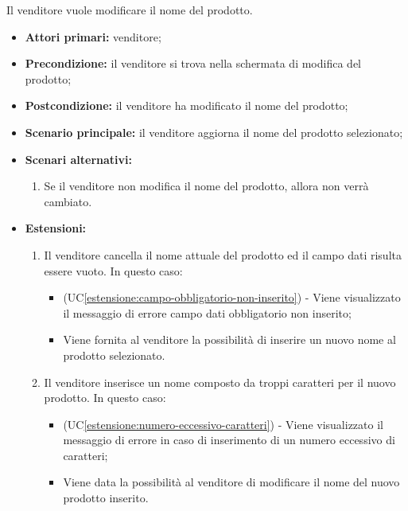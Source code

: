 Il venditore vuole modificare il nome del prodotto.
\begin{itemize}
    \item \textbf{Attori primari:} venditore;
    \item \textbf{Precondizione:} il venditore si trova nella schermata di modifica del prodotto;
    \item \textbf{Postcondizione:} il venditore ha modificato il nome del prodotto;
    \item \textbf{Scenario principale:} il venditore aggiorna il nome del prodotto selezionato;
    \item \textbf{Scenari alternativi:}
    \begin{enumerate}[label=\lett]
		\item Se il venditore non modifica il nome del prodotto, allora non verrà cambiato.
	\end{enumerate}
    \item \textbf{Estensioni:}
    \begin{enumerate}[label=\lett]
    	\item Il venditore cancella il nome attuale del prodotto ed il campo dati risulta essere vuoto. In questo caso:
    	\begin{itemize}
    		\item (UC\ref{estensione:campo-obbligatorio-non-inserito}) - Viene visualizzato il messaggio di errore campo dati obbligatorio non inserito;
    		\item Viene fornita al venditore la possibilità di inserire un nuovo nome al prodotto selezionato.
    	\end{itemize}
	\item Il venditore inserisce un nome composto da troppi caratteri per il nuovo prodotto. In questo caso:
    	\begin{itemize}
    		\item (UC\ref{estensione:numero-eccessivo-caratteri}) - Viene visualizzato il messaggio di errore in caso di inserimento di un numero eccessivo di caratteri;
    		\item Viene data la possibilità al venditore di modificare il nome del nuovo prodotto inserito.
    	\end{itemize}
    \end{enumerate}
\end{itemize}

\label{modifica-prodotto.descrizione}

